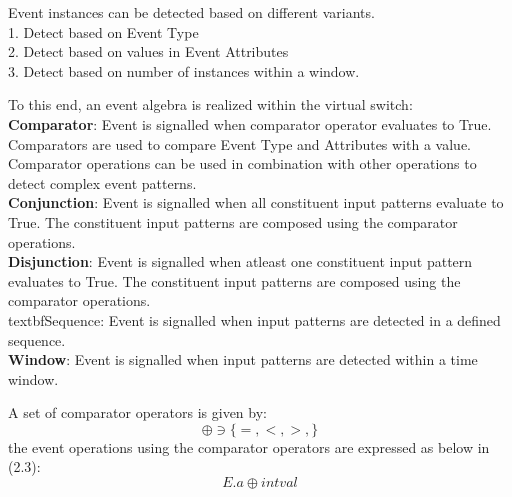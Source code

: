 \begin{flushleft}
Event instances can be detected based on different variants.
\\1. Detect based on Event Type
\\2. Detect based on values in Event Attributes
\\3. Detect based on number of instances within a window.
\\
\end{flushleft}
\begin{flushleft}
To this end, an event algebra is realized within the virtual switch:
\\
\textbf{Comparator}: Event is signalled when comparator operator evaluates to True. Comparators are used to compare Event Type and Attributes with a value. Comparator operations can be used in combination with other operations to detect complex event patterns.
\\ 
\textbf{Conjunction}: Event is signalled when all constituent input patterns evaluate to True. The constituent input patterns are composed using the comparator operations.
\\
\textbf{Disjunction}: Event is signalled when atleast one constituent input pattern evaluates to True. The constituent input patterns are composed using the comparator operations.
\\
textbf{Sequence}: Event is signalled when input patterns are detected in a defined sequence.
\\
\textbf{Window}: Event is signalled when input patterns are detected within a time window.
\end{flushleft}

\begin{flushleft}
A set of comparator operators is given by:
\begin{equation}
\oplus  \ni  \lbrace =,<,>, \rbrace
\end{equation}
the event operations using the comparator operators are expressed as below in (2.3):
\begin{equation}
E.a \oplus intval
\end{equation}
\end{flushleft}

